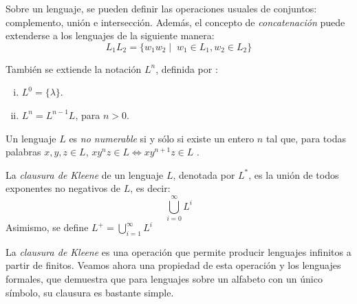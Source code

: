 Sobre un lenguaje, se pueden definir las operaciones usuales de conjuntos: complemento, unión e intersección. Además,
el concepto de \textit{concatenación} puede extenderse a los lenguajes de la siguiente manera:
\begin{equation}
    L_1L_2=\{w_1w_2\mid\; w_1\in L_1, w_2\in L_2\}
\end{equation}

También se extiende la notación $L^n$, definida por \cite{Yu1997}:
\begin{enumerate}[(i)]
    \item $L^0=\{\lambda\}$.
    \item $L^n=L^{n-1}L$, para $n>0$.
\end{enumerate}

Un lenguaje $L$ es \textit{no numerable} si y sólo si existe un entero $n$ tal que, para todas palabras $x, y, z\in L$,
$xy^nz\in L\iff xy^{n+1}z\in L$ \cite{Mateescu1997}.

\begin{definicion} La \textit{clausura de Kleene} de un lenguaje $L$, denotada por
$L^*$, es la unión de todos exponentes no negativos de $L$, es decir:
\begin{equation}
    \bigcup_{i=0}^\infty L^i
\end{equation}
Asimismo, se define $L^+=\displaystyle\bigcup_{i=1}^\infty L^i$ 
\end{definicion}

La \textit{clausura de Kleene} es una operación que permite producir lenguajes infinitos a partir de finitos. Veamos
ahora una propiedad de esta operación y los lenguajes formales, que demuestra que para lenguajes sobre un alfabeto con
un único símbolo, su clausura es bastante simple.

